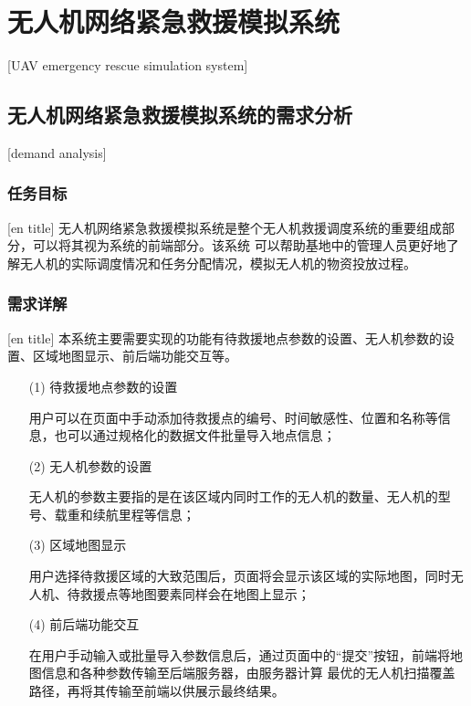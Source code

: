 
\chapter{无人机网络紧急救援模拟系统}[UAV emergency rescue simulation system]

\section{无人机网络紧急救援模拟系统的需求分析}[demand analysis]

\subsection{任务目标}[en title]
无人机网络紧急救援模拟系统是整个无人机救援调度系统的重要组成部分，可以将其视为系统的前端部分。该系统
可以帮助基地中的管理人员更好地了解无人机的实际调度情况和任务分配情况，模拟无人机的物资投放过程。
\subsection{需求详解}[en title]
本系统主要需要实现的功能有待救援地点参数的设置、无人机参数的设置、区域地图显示、前后端功能交互等。
\begin{itemize}
	\item [(1)] 待救援地点参数的设置


    \qquad 用户可以在页面中手动添加待救援点的编号、时间敏感性、位置和名称等信息，也可以通过规格化的数据文件批量导入地点信息；
    \item [(2)] 无人机参数的设置
    

    \qquad 无人机的参数主要指的是在该区域内同时工作的无人机的数量、无人机的型号、载重和续航里程等信息；
    \item [(3)] 区域地图显示
    

    \qquad 用户选择待救援区域的大致范围后，页面将会显示该区域的实际地图，同时无人机、待救援点等地图要素同样会在地图上显示；

    \item [(4)] 前后端功能交互
    

    \qquad 在用户手动输入或批量导入参数信息后，通过页面中的“提交”按钮，前端将地图信息和各种参数传输至后端服务器，由服务器计算
    最优的无人机扫描覆盖路径，再将其传输至前端以供展示最终结果。
\end{itemize}
